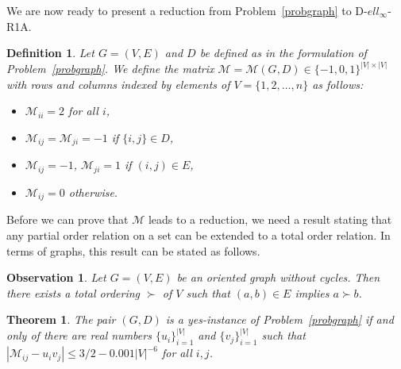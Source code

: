 \documentclass[a4paper,11pt]{article}
\newtheorem{theorem}{Theorem}
\newtheorem{definition}{Definition}
\newtheorem{obs}{Observation}
\numberwithin{equation}{section}
\begin{document}
We are now ready to present a reduction from Problem~\ref{probgraph} to D-$ell_\infty$-R1A. 
\begin{definition}
Let $G=(V,E)$ and $D$ be defined as in the formulation of Problem~\ref{probgraph}. 
We define the matrix $\mathcal{M}=\mathcal{M}(G,D) \in \{-1,0,1\}^{|V| \times |V|}$ with rows and columns indexed by elements of $V=\{1,2,\dots,n\}$ as follows:
\begin{itemize} \setlength{\itemindent}{0cm}   
\item[(1)] $\mathcal{M}_{ii}=2$ for all $i$,

\item[(2)] $\mathcal{M}_{ij}=\mathcal{M}_{ji}=-1$ if $\{i,j\}\in D$,

\item[(3)] $\mathcal{M}_{ij}=-1$, $\mathcal{M}_{ji}=1$ if $(i,j)\in E$,

\item[(4)]  $\mathcal{M}_{ij}=0$ otherwise.
\end{itemize}
\end{definition}

Before we can prove that $\mathcal{M}$ leads to a reduction, 
we need a result stating that any partial order relation on a set can be extended to a total order relation. In terms of graphs, this result can be stated as follows.

\begin{obs}\label{obserpermut}
Let $G=(V,E)$ be an oriented graph without cycles. Then there exists a total ordering $\succ$ of $V$ such that $(a,b)\in E$ implies $a\succ b$.
\end{obs}

\begin{theorem}\label{thrred}
The pair $(G,D)$ is a yes-instance of Problem~\ref{probgraph} if and only of there are real numbers 
$\{u_i\}_{i=1}^{|V|}$ and $\{v_j\}_{i=1}^{|V|}$ such that $|\mathcal{M}_{ij}-u_iv_j| \leq 3/2-0.001 |V|^{-6}$ for all $i,j$. 
\end{theorem}
\end{document}
